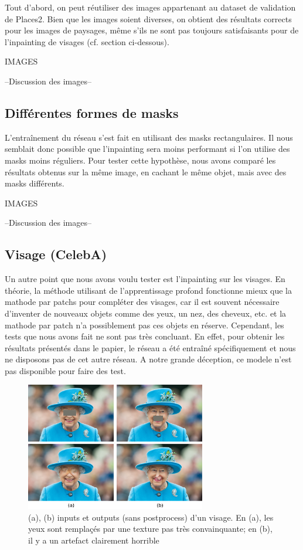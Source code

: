 \documentclass[12pt]{article}
\begin{document}
Tout d'abord, on peut réutiliser des images appartenant au dataset de validation de Places2. Bien que les images soient diverses, on obtient des résultats corrects pour les images de paysages, même s'ils ne sont pas toujours satisfaisants pour de l'inpainting de visages (cf. section ci-dessous).

IMAGES

--Discussion des images--

\subsection{Différentes formes de masks}

L'entraînement du réseau s'est fait en utilisant des masks rectangulaires. Il nous semblait donc possible que l'inpainting sera moins performant si l'on utilise des masks moins réguliers. Pour tester cette hypothèse, nous avons comparé les résultats obtenus sur la même image, en cachant le même objet, mais avec des masks différents.

IMAGES

--Discussion des images--

\subsection{Visage (CelebA)}

Un autre point que nous avons voulu tester est l'inpainting sur les visages. En théorie, la méthode utilisant de l'apprentissage profond fonctionne mieux que la mathode par patchs pour compléter des visages, car il est souvent nécessaire d'inventer de nouveaux objets comme des yeux, un nez, des cheveux, etc. et la mathode par patch n'a possiblement pas ces objets en réserve. Cependant, les tests que nous avons fait ne sont pas très concluant. En effet, pour obtenir les résultats présentés dans le papier, le réseau a été entraîné spécifiquement et nous ne disposons pas de cet autre réseau. A notre grande déception, ce modele n'est pas disponible pour faire des test.

\begin{center}
\begin{figure}[H]
    \includegraphics[width=0.7\textwidth]{Images/reine.png}
    \caption{(a), (b) inputs et outputs (sans postprocess) d'un visage. En (a), les yeux sont remplaçés par une texture pas très convainquante; en (b), il y a un artefact clairement horrible}
\end{figure}
\end{center}
\end{document}
